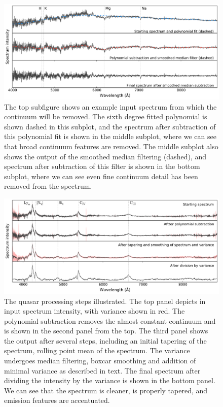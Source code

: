 \documentclass[iop]{emulateapj}
\begin{document}
\begin{figure}[t]
\centering
\includegraphics[width=\textwidth]{continuum.pdf}
\caption{The top subfigure shows an example input spectrum from which the continuum will be removed. The sixth degree fitted polynomial is shown dashed in this subplot, and the spectrum after subtraction of this polynomial fit is shown in the middle subplot, where we can see that broad continuum features are removed. The middle subplot also shows the output of the smoothed median filtering (dashed), and spectrum after subtraction of this filter is shown in the bottom subplot, where we can see even fine continuum detail has been removed from the spectrum.}
\label{fig:continuum}
\end{figure}

\begin{figure}[t]
\centering
\includegraphics[width=\textwidth]{quasarProcess.pdf}
\caption{The quasar processing steps illustrated. The top panel depicts in input spectrum intensity, with variance shown in red. The polynomial subtraction removes the almost constant continuum and is shown in the second panel from the top. The third panel shows the output after several steps, including an initial tapering of the spectrum, rolling point mean of the spectrum. The variance undergoes median filtering, boxcar smoothing and addition of minimal variance as described in text. The final spectrum after dividing the intensity by the variance is shown in the bottom panel. We can see that the spectrum is cleaner, is properly tapered, and emission features are accentuated.}
\label{fig:quasarProcess}
\end{figure}
\end{document}
